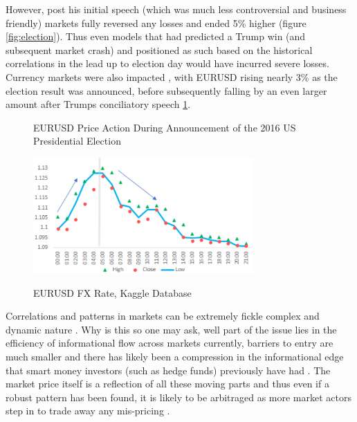 \documentclass[11pt, a4paper]{article}
\begin{document}
However, post his initial speech (which was much less controversial and business friendly) markets fully reversed any losses and ended 5\% higher (figure \ref{fig:election}). Thus even models that had predicted a Trump win (and subsequent market crash) and positioned as such based on the historical correlations in the lead up to election day would have incurred severe losses. Currency markets were also impacted , with EURUSD rising nearly 3\% as the election result was announced, before subsequently falling by an even larger amount after Trumps conciliatory speech \ref{fig:EURElection}. 
\begin{figure}[h]
    \centering
	\caption{EURUSD Price Action During Announcement of the 2016 US Presidential Election}
    \includegraphics[width=0.75\textwidth]{EURUSDElection}
    \label{fig:EURElection}
	\caption*{EURUSD FX Rate, Kaggle Database}
\end{figure}
\par Correlations and patterns in markets can be extremely fickle complex and dynamic nature \cite{Camargo2013}. Why is this so one may ask, well part of the issue lies in the efficiency of informational flow across markets currently, barriers to entry are much smaller and there has likely been a compression in the informational edge that smart money investors (such as hedge funds) previously have had \cite{hedgefundRets}. The market price itself is a reflection of all these moving parts and thus even if a robust pattern has been found, it is likely to be arbitraged as more market actors step in to trade away any mis-pricing \cite{Bartram2019}. 
\par
\end{document}
